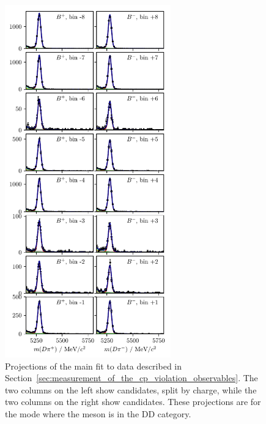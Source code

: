 \begin{figure}[tp]
    \includegraphics[height=6in]{figures/analysis/bin_by_bin/pretty_fit_bins_dpi_DD_1.pdf}
    \caption{Projections of the main fit to data described in Section~\ref{sec:measurement_of_the_cp_violation_observables}. The two columns on the left show \BtoDK candidates, split by charge, while the two columns on the right show \BtoDpi candidates. These projections are for the \DtoKspp mode where the \KS meson is in the DD category.}
    \label{fig:all_proj_DD_1}
\end{figure}

